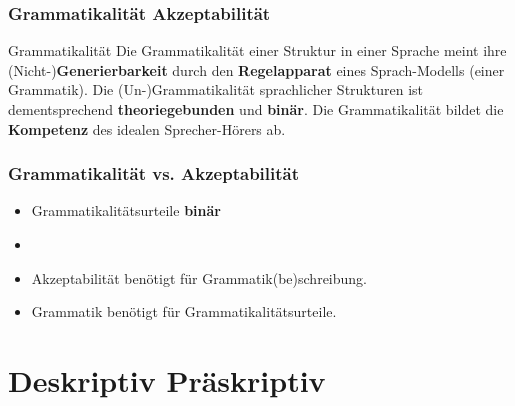 \begin{frame}
\frametitle{Grammatikalität \vs Akzeptabilität}

\begin{block}{Grammatikalität}
Die Grammatikalität einer Struktur in einer Sprache meint ihre (Nicht-)\textbf{Generierbarkeit} durch den \textbf{Regelapparat} eines Sprach-Modells (einer Grammatik). Die (Un-)Grammatikalität sprachlicher Strukturen ist dementsprechend \textbf{theoriegebunden} und \idR \textbf{binär}. 
Die Grammatikalität bildet die \textbf{Kompetenz} des idealen Sprecher-Hörers ab. \citep[vgl.][]{Fries16a}
\end{block}

\end{frame}


\begin{frame}
\frametitle{Grammatikalität vs. Akzeptabilität}

\begin{itemize}

	\item Grammatikalitätsurteile \ras \textbf{binär}
		
	\z
	
	\z
	
	\item[]
	
	\item Akzeptabilität benötigt für Grammatik(be)schreibung.

	\item Grammatik benötigt für Grammatikalitätsurteile. 

\end{itemize}

\end{frame}


\section{Deskriptiv \vs Präskriptiv}



